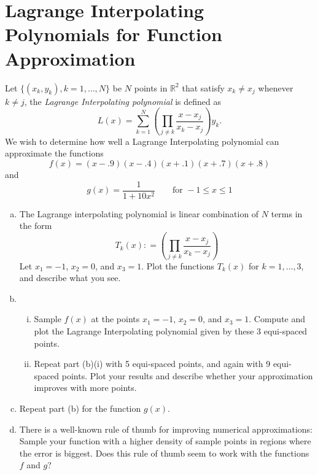 
\section{Lagrange Interpolating Polynomials for Function Approximation}
Let $\{(x_k,y_k) , k = 1, \dots, N\}$ be $N$ points in $\mathbb{R}^2$ that satisfy $x_k \neq x_j$ whenever $k \neq j$, the \textit{Lagrange Interpolating polynomial} is defined as
\begin{equation}
L(x) = \sum_{k = 1}^N \left(\prod_{j \neq k}\frac{x-x_j}{x_k-x_j} \right) y_k.
\end{equation}
We wish to determine how well a Lagrange Interpolating polynomial can approximate the functions 
\begin{equation}
f(x) = (x-.9)(x-.4)(x+.1)(x+.7)(x+.8)
\end{equation}
and 
\begin{equation}
g(x) = \frac{1}{1+10x^2} \quad \quad \text{for } -1 \leq x \leq 1
\end{equation}
\begin{enumerate}[(a)]
    \item The Lagrange interpolating polynomial is linear combination of $N$ terms in the form
    \begin{equation}
    T_k(x): =\left( \prod_{j \neq k}\frac{x-x_j}{x_k-x_j}  \right) 
    \end{equation}
    Let $x_1= -1$, $x_2 = 0$, and $x_3 = 1$. Plot the functions $T_k(x)$ for $k = 1,\dots,3$, and describe what you see.
    \item 
    \begin{enumerate}[i.]
      \item Sample $f(x)$ at the points $x_1 = -1$, $x_2 = 0$, and $x_3= 1$. Compute and plot the Lagrange Interpolating polynomial given by these 3 equi-spaced points.
      \item Repeat part (b)(i) with 5 equi-spaced points, and again with 9 equi-spaced points. Plot your results and describe whether your approximation improves with more points. 
    \end{enumerate}
    \item Repeat part (b) for the function $g(x)$.
    \item There is a well-known rule of thumb for improving numerical approximations: Sample your function with a higher density of sample points in regions where the error is biggest. Does this rule of thumb seem to work with the functions $f$ and $g$?
\end{enumerate}

